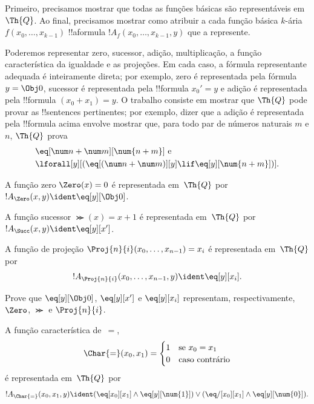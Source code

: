 \documentclass[../../../include/open-logic-section]{subfiles}
\begin{document}

Primeiro, precisamos mostrar que todas as funções básicas são
representáveis em~$\Th{Q}$. Ao final, precisamos mostrar como atribuir
a cada função básica $k$-ária $f(x_0,\dots,x_{k-1})$ !!a{formula}
$!A_f(x_0,\dots,x_{k-1},y)$ que a represente.

Poderemos representar zero, sucessor, adição, multiplicação, a função
característica da igualdade e as projeções. Em cada caso, a fórmula
representante adequada é inteiramente direta; por exemplo, zero é
representada pela fórmula $y = \Obj 0$, sucessor é representada pela
!!{formula} $x_0' = y$ e adição é representada pela !!{formula}
$(x_0 + x_1) = y$. O trabalho consiste em mostrar que $\Th{Q}$ pode
provar as !!{sentence}s pertinentes; por exemplo, dizer que a adição é
representada pela !!{formula} acima envolve mostrar que, para todo par
de números naturais $m$ e $n$, $\Th{Q}$ prova
\begin{align*}
& \eq[\num n + \num m][\num {n+m}] \text{ e}\\
& \lforall[y][(\eq[(\num n + \num m)][y] \lif \eq[y][\num{n+m}])].
\end{align*}

\begin{prop}
 A função zero $\Zero(x) = 0$ é representada em~$\Th{Q}$ por
$!A_{\Zero}(x,y) \ident \eq[y][\Obj 0]$.
\end{prop}

\begin{prop}
A função sucessor $\Succ(x) = x+1$ é representada em~$\Th{Q}$ por
$!A_{\Succ}(x,y) \ident \eq[y][x']$.  
\end{prop}

\begin{prop}
A função de projeção $\Proj{n}{i}(x_0, \dots, x_{n-1}) = x_i$ é
representada em~$\Th{Q}$ por \[!A_{\Proj{n}{i}}(x_0, \dots, x_{n-1}, y) \ident \eq[y][x_i].\]
\end{prop}

\begin{prob}
Prove que $\eq[y][\Obj 0]$, $\eq[y][x']$ e $\eq[y][x_i]$ representam,
respectivamente, $\Zero$, $\Succ$ e $\Proj{n}{i}$.
\end{prob}

\begin{prop}
A função característica de~$=$,
\[
\Char{=}(x_0, x_1) =
\begin{cases}
  1 & \text{se } x_0 =x_1\\
  0 & \text{caso contrário}
\end{cases}
\]
é representada em~$\Th{Q}$ por
\[
  !A_{\Char{=}}(x_0, x_1, y) \ident (\eq[x_0][x_1] \land \eq[y][\num{1}]) \lor (\eq/[x_0][x_1] \land
\eq[y][\num{0}]).
\]
\end{prop}
\end{document}

